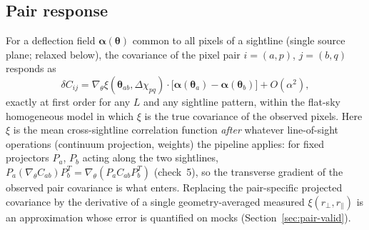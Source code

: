 \documentclass[11pt,a4paper]{article}
\newcommand{\vth}{\bm{\theta}}
\begin{document}
\subsection{Pair response}
For a deflection field $\bm\alpha(\vth)$ common to all pixels of a sightline (single source plane; relaxed below), the covariance of the pixel pair $i=(a,p)$, $j=(b,q)$ responds as
\begin{equation}
\delta C_{ij}=\nabla_\theta\xi(\vth_{ab},\Delta\chi_{pq})\cdot\big[\bm\alpha(\vth_a)-\bm\alpha(\vth_b)\big]+O(\alpha^2),
\label{eq:Rij}
\end{equation}
exactly at first order for any $L$ and any sightline pattern, within the flat-sky homogeneous model in which $\xi$ is the true covariance of the observed pixels. Here $\xi$ is the mean cross-sightline correlation function \emph{after} whatever line-of-sight operations (continuum projection, weights) the pipeline applies: for fixed projectors $P_a$, $P_b$ acting along the two sightlines, $P_a(\nabla_\theta C_{ab})P_b^T=\nabla_\theta(P_aC_{ab}P_b^T)$ (check~5), so the transverse gradient of the observed pair covariance is what enters. Replacing the pair-specific projected covariance by the derivative of a single geometry-averaged measured $\xi(r_\perp,r_\parallel)$ is an approximation whose error is quantified on mocks (Section~\ref{sec:pair-valid}).
\end{document}
